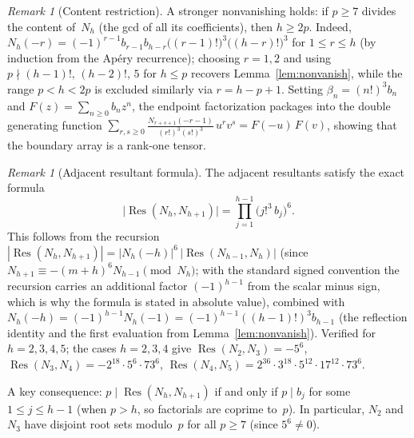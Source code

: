 \documentclass[11pt]{article}
\theoremstyle{definition}
\theoremstyle{remark}
\newtheorem{remark}[theorem]{Remark}
\begin{document}
\begin{remark}[Content restriction]\label{rem:content}
A stronger nonvanishing holds: if $p \ge 7$ divides the
content of~$N_h$ (the gcd of all its coefficients), then
$h \ge 2p$.
Indeed, $N_h(-r) = (-1)^{r-1}b_{r-1}b_{h-r}\bigl((r{-}1)!\bigr)^3
\bigl((h{-}r)!\bigr)^3$ for $1 \le r \le h$
(by induction from the Ap\'ery recurrence);
choosing $r = 1, 2$ and using
$p \nmid (h{-}1)!,\,(h{-}2)!,\,5$ for $h \le p$
recovers Lemma~\ref{lem:nonvanish},
while the range $p < h < 2p$ is excluded similarly
via $r = h - p + 1$.
Setting $\beta_n = (n!)^3 b_n$ and
$F(z) = \sum_{n \ge 0} b_n z^n$, the endpoint factorization
packages into the double generating function
$\sum_{r,s \ge 0}
\frac{N_{r+s+1}(-r{-}1)}{(r!)^3(s!)^3}\,u^r v^s
= F(-u)\,F(v)$,
showing that the boundary array is a rank-one tensor.
\end{remark}

\begin{remark}[Adjacent resultant formula]\label{rem:adj-res}
The adjacent resultants satisfy the exact formula
\begin{equation}\label{eq:adj-res}
\bigl|\operatorname{Res}(N_h, N_{h+1})\bigr|
= \prod_{j=1}^{h-1} \bigl(j!^3\,b_j\bigr)^6.
\end{equation}
This follows from the recursion
$|\operatorname{Res}(N_h, N_{h+1})| = |N_h(-h)|^6\,
|\operatorname{Res}(N_{h-1}, N_h)|$ (since
$N_{h+1} \equiv -(m{+}h)^6 N_{h-1} \pmod{N_h}$;
with the standard signed convention the recursion
carries an additional factor $(-1)^{h-1}$ from the
scalar minus sign, which is why the formula is stated
in absolute value),
combined with $N_h(-h) = (-1)^{h-1}N_h(-1)
= (-1)^{h-1}((h{-}1)!)^3 b_{h-1}$
(the reflection identity and the first evaluation
from Lemma~\ref{lem:nonvanish}).
Verified for $h = 2, 3, 4, 5$; the cases
$h = 2, 3, 4$ give
$\operatorname{Res}(N_2, N_3) = -5^6$, \;
$\operatorname{Res}(N_3, N_4) = -2^{18}\cdot 5^6\cdot 73^6$, \;
$\operatorname{Res}(N_4, N_5) = 2^{36}\cdot 3^{18}\cdot 5^{12}\cdot 17^{12}\cdot 73^6$.

A key consequence: $p \mid \operatorname{Res}(N_h, N_{h+1})$
if and only if $p \mid b_j$ for some $1 \le j \le h-1$
(when $p > h$, so factorials are coprime to~$p$).
In particular, $N_2$ and $N_3$ have disjoint root sets
modulo~$p$ for all $p \ge 7$ (since $5^6 \ne 0$).
\end{remark}
\end{document}
